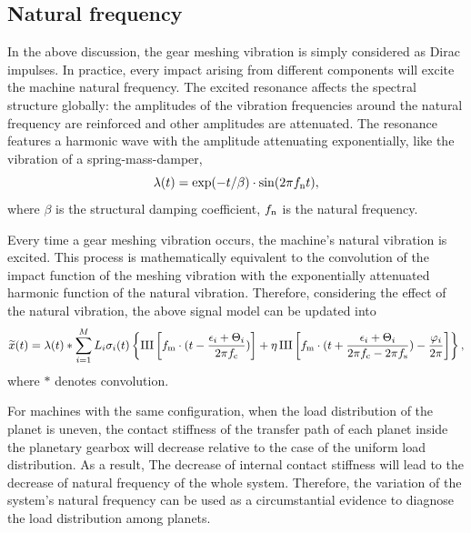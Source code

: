 \documentclass[a4paper,fleqn]{cas-sc}%
\begin{document}
\subsection{Natural frequency}
\par In the above discussion, the gear meshing vibration is simply considered as Dirac impulses. In practice, every impact arising from different components will excite the machine natural frequency. The excited resonance affects the spectral structure globally: the amplitudes of the vibration frequencies around the natural frequency are reinforced and other amplitudes are attenuated. The resonance features a harmonic wave with the amplitude attenuating exponentially, like the vibration of a spring-mass-damper,
\begin{equation}
    \lambda(t)=\exp(-t/\beta)\cdot \sin(2 \pi f_{\rm n} t),
\end{equation}
where $\beta$ is the structural damping coefficient, $f_{\rm n}$ is the natural frequency.
\par Every time a gear meshing vibration occurs, the machine's natural vibration is excited. This process is mathematically equivalent to the convolution of the impact function of the meshing vibration with the exponentially attenuated harmonic function of the natural vibration. Therefore, considering the effect of the natural vibration, the above signal model can be updated into
\begin{equation}
    \widetilde{x} (t)=\lambda(t) \ast \sum_{i=1}^{M} L_i \sigma_i(t) \left\{ \operatorname{III}\left[f_{\rm m} \cdot (t-\frac{\epsilon_i+\Theta_i}{2 \pi f_{\rm c}})\right]%
    + \eta \operatorname{III}\left[f_{\rm m} \cdot (t + \frac{\epsilon_i+\Theta_i}{2 \pi f_{\rm c}-2 \pi f_{\rm s}}) - \frac{\varphi_i}{2 \pi} \right]%
    \right\},\label{eq:final_signal_model}
\end{equation}
where $\ast$ denotes convolution.
\par For machines with the same configuration, when the load distribution of the planet is uneven, the contact stiffness of the transfer path of each planet inside the planetary gearbox will decrease relative to the case of the uniform load distribution. As a result, The decrease of internal contact stiffness will lead to the decrease of natural frequency of the whole system. Therefore, the variation of the system's natural frequency can be used as a circumstantial evidence to diagnose the load distribution among planets.
\end{document}
